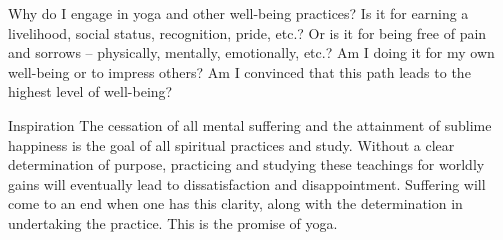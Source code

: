 



\newpage
\begin{mananam}{}
\mananamtext Why do I engage in yoga and other well-being practices? Is it for earning a livelihood, social status, recognition, pride, etc.? Or is it for being free of pain and sorrows – physically, mentally, emotionally, etc.? Am I doing it for my own well-being or to impress others? Am I convinced that this path leads to the highest level of well-being?
\end{mananam}
\WritingHand{}
\begin{inspiration}{\mananamfont Inspiration}
\mananamtext The cessation of all mental suffering and the attainment of sublime happiness is the goal of all spiritual practices and study. Without a clear determination of purpose, practicing and studying these teachings for worldly gains will eventually lead to dissatisfaction and disappointment. Suffering will come to an end when one has this clarity, along with the determination in undertaking the practice. This is the promise of yoga.
\end{inspiration}
\newpage



